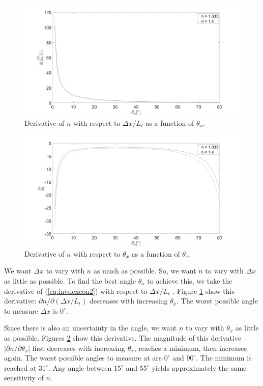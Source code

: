 \documentclass[draft]{svjour3}                     %
\begin{document}
\begin{figure}[hpbt]
	\includegraphics[width=\textwidth, keepaspectratio]{dndx.png}
	\caption{Derivative of $n$ with respect to $\Delta x / L_t$ as a function of $\theta_x$.}	
	\label{fig:dndx}
\end{figure}

\begin{figure}[hpbt]
	\includegraphics[width=\textwidth, keepaspectratio]{dndt.png}
	\caption{Derivative of $n$ with respect to $\theta_x$ as a function of $\theta_x$.}		
	\label{fig:dndt}
\end{figure}

We want $\Delta x$ to vary with $n$ as much as possible. So, we want $n$ to vary with $\Delta x$ as little as possible.  To find the best angle $\theta_x$ to achieve this, we take the derivative of (\ref{eq:invdexcon2}) with respect to $\Delta x/L_t$ \cite{nemoto1992measurement}. Figure \ref{fig:dndx} show this derivative: $\partial n/\partial (\Delta x/L_t)$ decreases with increasing $\theta_x$. The worst possible angle to measure $\Delta x$ is $0^\circ$.

Since there is also an uncertainty in the angle, we want $n$ to vary with $\theta_x$ as little as possible. Figures \ref{fig:dndt} show this derivative. The magnitude of this derivative $\left|\partial n/\partial \theta_x\right|$ first decreases with increasing $\theta_x$, reaches a minimum, then increases again. The worst possible angles to measure at are $0^\circ$ and $90^\circ$. The minimum is reached at $31^\circ$. Any angle between $15^\circ$ and $55^\circ$ yields approximately the same sensitivity of $n$. 
\end{document}
